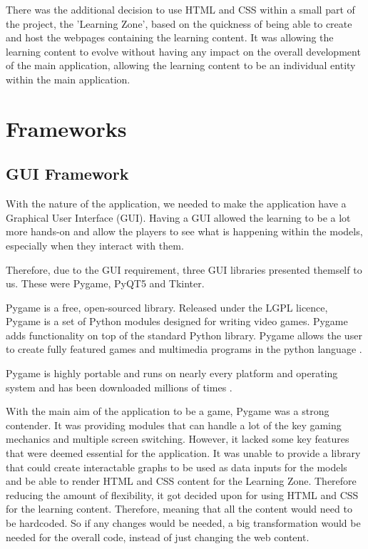 	There was the additional decision to use HTML and CSS within a small part of the project, the 'Learning Zone', based on the quickness of being able to create and host the webpages containing the learning content. It was allowing the learning content to evolve without having any impact on the overall development of the main application, allowing the learning content to be an individual entity within the main application.
	
	

	
	\section{Frameworks}
	
	\subsection{GUI Framework}
	
	With the nature of the application, we needed to make the application have a Graphical User Interface (GUI). Having a GUI allowed the learning to be a lot more hands-on and allow the players to see what is happening within the models, especially when they interact with them.
	
	Therefore, due to the GUI requirement, three GUI libraries presented themself to us. These were Pygame, PyQT5 and Tkinter.
	
	Pygame is a free, open-sourced library. Released under the LGPL licence, Pygame is a set of Python modules designed for writing video games. Pygame adds functionality on top of the standard Python library. Pygame allows the user to create fully featured games and multimedia programs in the python language \cite{pygame_wiki}.
	
	Pygame is highly portable and runs on nearly every platform and operating system and has been downloaded millions of times \cite{pygame_wiki}. 
	
	With the main aim of the application to be a game, Pygame was a strong contender. It was providing modules that can handle a lot of the key gaming mechanics and multiple screen switching. However, it lacked some key features that were deemed essential for the application. It was unable to provide a library that could create interactable graphs to be used as data inputs for the models and be able to render HTML and CSS content for the Learning Zone. Therefore reducing the amount of flexibility, it got decided upon for using HTML and CSS for the learning content. Therefore, meaning that all the content would need to be hardcoded. So if any changes would be needed, a big transformation would be needed for the overall code, instead of just changing the web content.
	
